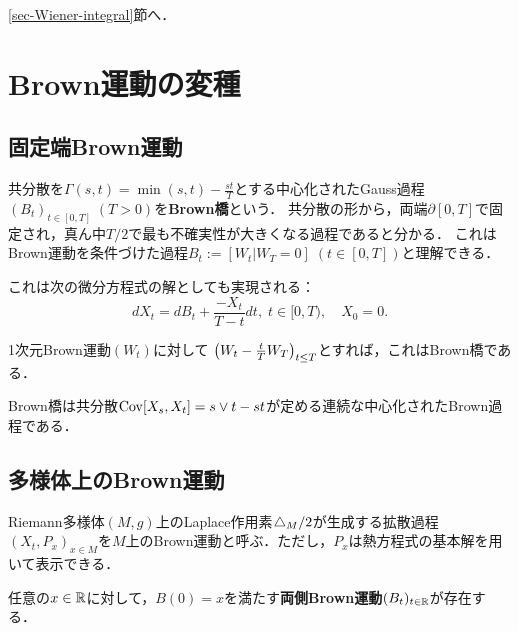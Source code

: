 \documentclass[uplatex,dvipdfmx]{jsreport}
\begin{document}
\begin{tcolorbox}[colframe=ForestGreen, colback=ForestGreen!10!white,breakable,colbacktitle=ForestGreen!40!white,coltitle=black,fonttitle=\bfseries\sffamily,
title=]
    \ref{sec-Wiener-integral}節へ．
\end{tcolorbox}

\section{Brown運動の変種}

\subsection{固定端Brown運動}

\begin{definition}
    共分散を$\Gamma(s,t)=\min(s,t)-\frac{st}{T}$とする中心化されたGauss過程$(B_t)_{t\in[0,T]}\;(T>0)$を\textbf{Brown橋}という．
    共分散の形から，両端$\partial[0,T]$で固定され，真ん中$T/2$で最も不確実性が大きくなる過程であると分かる．
    これはBrown運動を条件づけた過程$B_t:=[W_t|W_T=0]\;(t\in[0,T])$と理解できる．
\end{definition}
\begin{remarks}
    これは次の微分方程式の解としても実現される：
    \[dX_t=dB_t+\frac{-X_t}{T-t}dt,\;t\in[0,T),\quad X_0=0.\]
\end{remarks}

\begin{construction}
    1次元Brown運動$(W_t)$に対して
    $\left(W_t-\frac{t}{T}W_T\right)_{t\le T}$とすれば，これはBrown橋である．
\end{construction}

\begin{proposition}
    Brown橋は共分散$\mathrm{Cov}[X_s,X_t]=s\lor t-st$が定める連続な中心化されたBrown過程である．
\end{proposition}

\subsection{多様体上のBrown運動}

\begin{definition}
    Riemann多様体$(M,g)$上のLaplace作用素$\mathop{}\!\mathbin\bigtriangleup_M/2$が生成する拡散過程$(X_t,P_x)_{x\in M}$を$M$上のBrown運動と呼ぶ．ただし，$P_x$は熱方程式の基本解を用いて表示できる．
\end{definition}

\begin{proposition}
    任意の$x\in\mathbb{R}$に対して，$B(0)=x$を満たす\textbf{両側Brown運動}$(B_t)_{t\in\mathbb{R}}$が存在する．
\end{proposition}
\end{document}
